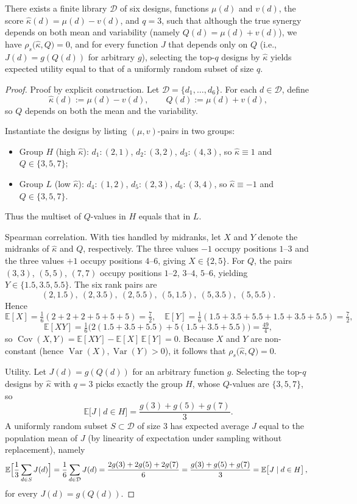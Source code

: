 ﻿\begin{theorem}\label{thm:orthogonal-score}
There exists a finite library $\mathcal D$ of six designs, functions $\mu(d)$ and $v(d)$, the score $\widehat{\kappa}(d)=\mu(d)-v(d)$, and $q=3$, such that although the true synergy depends on both mean and variability (namely $Q(d)=\mu(d)+v(d)$), we have $\rho_s\!\big(\widehat{\kappa},Q\big)=0$, and for every function $J$ that depends only on $Q$ (i.e., $J(d)=g(Q(d))$ for arbitrary $g$), selecting the top-$q$ designs by $\widehat{\kappa}$ yields expected utility equal to that of a uniformly random subset of size $q$.
\end{theorem}

\begin{proof}
Proof by explicit construction. Let $\mathcal D=\{d_1,\dots,d_6\}$. For each $d\in\mathcal D$, define
\[
\widehat{\kappa}(d):=\mu(d)-v(d),\qquad Q(d):=\mu(d)+v(d),
\]
so $Q$ depends on both the mean and the variability.

Instantiate the designs by listing $(\mu,v)$-pairs in two groups:
\begin{itemize}
  \item Group $H$ (high $\widehat{\kappa}$): $d_1\!:\!(2,1)$, $d_2\!:\!(3,2)$, $d_3\!:\!(4,3)$, so $\widehat{\kappa}\equiv 1$ and $Q\in\{3,5,7\}$;
  \item Group $L$ (low $\widehat{\kappa}$): $d_4\!:\!(1,2)$, $d_5\!:\!(2,3)$, $d_6\!:\!(3,4)$, so $\widehat{\kappa}\equiv -1$ and $Q\in\{3,5,7\}$.
\end{itemize}
Thus the multiset of $Q$-values in $H$ equals that in $L$.

Spearman correlation. With ties handled by midranks, let $X$ and $Y$ denote the midranks of $\widehat{\kappa}$ and $Q$, respectively. The three values $-1$ occupy positions $1$--$3$ and the three values $+1$ occupy positions $4$--$6$, giving $X\in\{2,5\}$. For $Q$, the pairs $(3,3)$, $(5,5)$, $(7,7)$ occupy positions $1$--$2$, $3$--$4$, $5$--$6$, yielding $Y\in\{1.5,3.5,5.5\}$. The six rank pairs are
\[(2,1.5),\ (2,3.5),\ (2,5.5),\ (5,1.5),\ (5,3.5),\ (5,5.5).
\]
Hence
\[
\mathbb E[X]=\tfrac{1}{6}(2+2+2+5+5+5)=\tfrac{7}{2},\quad
\mathbb E[Y]=\tfrac{1}{6}(1.5+3.5+5.5+1.5+3.5+5.5)=\tfrac{7}{2},
\]
\[
\mathbb E[XY]=\tfrac{1}{6}\big(2(1.5+3.5+5.5)+5(1.5+3.5+5.5)\big)=\tfrac{49}{4},
\]
so $\operatorname{Cov}(X,Y)=\mathbb E[XY]-\mathbb E[X]\,\mathbb E[Y]=0$. Because $X$ and $Y$ are non-constant (hence $\operatorname{Var}(X),\operatorname{Var}(Y)>0$), it follows that $\rho_s\!\big(\widehat{\kappa},Q\big)=0$.

Utility. Let $J(d)=g(Q(d))$ for an arbitrary function $g$. Selecting the top-$q$ designs by $\widehat{\kappa}$ with $q=3$ picks exactly the group $H$, whose $Q$-values are $\{3,5,7\}$, so
\[
\mathbb E\big[J\mid d\in H\big]=\frac{g(3)+g(5)+g(7)}{3}.
\]
A uniformly random subset $S\subset\mathcal D$ of size $3$ has expected average $J$ equal to the population mean of $J$ (by linearity of expectation under sampling without replacement), namely
\[
\mathbb E\Big[\frac{1}{3}\sum_{d\in S} J(d)\Big]
=\frac{1}{6}\sum_{d\in\mathcal D} J(d)
=\frac{2g(3)+2g(5)+2g(7)}{6}
=\frac{g(3)+g(5)+g(7)}{3}
=\mathbb E\big[J\mid d\in H\big] \,,\ \qedhere
\]
for every $J(d)=g(Q(d))$.
\end{proof}
